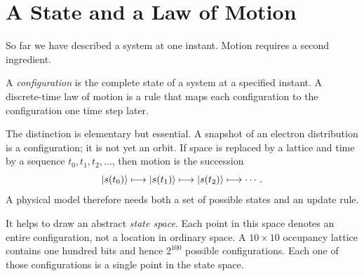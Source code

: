 \begin{classroomqa}
\end{classroomqa}

\section{A State and a Law of Motion}

So far we have described a system at one instant. Motion requires a second ingredient.

\begin{definition}
A \emph{configuration} is the complete state of a system at a specified instant. A discrete-time law of motion is a rule that maps each configuration to the configuration one time step later.
\end{definition}

The distinction is elementary but essential. A snapshot of an electron distribution is a configuration; it is not yet an orbit. If space is replaced by a lattice and time by a sequence \(t_0,t_1,t_2,\ldots\), then motion is the succession
\begin{equation}
  \left\lvert s(t_0)\right\rangle
  \longmapsto
  \left\lvert s(t_1)\right\rangle
  \longmapsto
  \left\lvert s(t_2)\right\rangle
  \longmapsto\cdots.
  \label{eq:l01-discrete-motion}
\end{equation}
A physical model therefore needs both a set of possible states and an update rule.

\begin{classroomqa}
\end{classroomqa}

It helps to draw an abstract \emph{state space}. Each point in this space denotes an entire configuration, not a location in ordinary space. A \(10\times10\) occupancy lattice contains one hundred bits and hence \(2^{100}\) possible configurations. Each one of those configurations is a single point in the state space.

